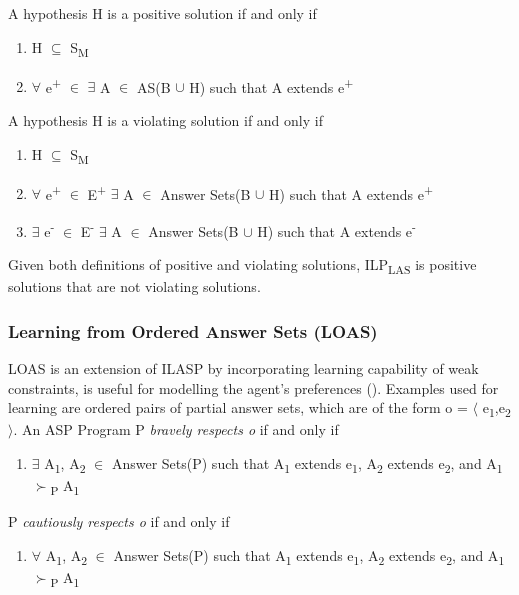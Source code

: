 \documentclass[12pt,twoside]{report}
\begin{document}
A hypothesis H is a positive solution if and only if
\begin{enumerate}
\item H $\subseteq$ S\textsubscript{M}
\item $\forall$ e\textsuperscript{+} $\in$ $\exists$ A $\in$ AS(B $\cup$ H) such that A extends e\textsuperscript{+}
\end{enumerate}
A hypothesis H is a violating solution if and only if
\begin{enumerate}
\item H $\subseteq$ S\textsubscript{M}
\item $\forall$ e\textsuperscript{+} $\in$ E\textsuperscript{+} $\exists$ A $\in$ Answer Sets(B $\cup$ H) such that A extends e\textsuperscript{+}
\item $\exists$ e\textsuperscript{-} $\in$ E\textsuperscript{-} $\exists$ A $\in$ Answer Sets(B $\cup$ H) such that A extends e\textsuperscript{-}\\
\end{enumerate}

Given both definitions of positive and violating solutions, ILP\textsubscript{LAS} is positive solutions that are not violating solutions.

\subsubsection{Learning from Ordered Answer Sets (LOAS)}

LOAS is an extension of ILASP by incorporating learning capability of weak constraints, is useful for modelling the agent's preferences (\cite{Law2015}).
Examples used for learning are ordered pairs of partial answer sets, which are of the form o = $\langle$ e\textsubscript{1},e\textsubscript{2} $\rangle$.  An ASP Program P \textit{bravely respects o } if and only if
\begin{enumerate}
\item $\exists$ A\textsubscript{1}, A\textsubscript{2} $\in$ Answer Sets(P) such that A\textsubscript{1} extends e\textsubscript{1}, A\textsubscript{2} extends e\textsubscript{2}, and A\textsubscript{1} $\succ$\textsubscript{P} A\textsubscript{1}
\end{enumerate}

P \textit{cautiously respects o } if and only if
\begin{enumerate}
\item $\forall$ A\textsubscript{1}, A\textsubscript{2} $\in$ Answer Sets(P) such that A\textsubscript{1} extends e\textsubscript{1}, A\textsubscript{2} extends e\textsubscript{2}, and A\textsubscript{1} $\succ$\textsubscript{P} A\textsubscript{1}
\end{enumerate}
\end{document}
